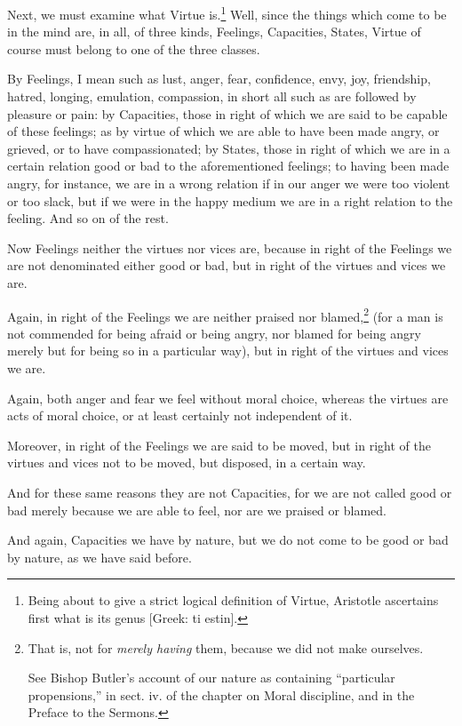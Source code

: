 
Next, we must examine what Virtue is.\footnote{Being about to give a strict logical definition of Virtue, Aristotle
ascertains first what is its genus [Greek: ti estin].}
Well, since the things which come to be in the mind are, in all, of three
kinds, Feelings, Capacities, States, Virtue of course must belong to one of the
three classes.

By Feelings, I mean such as lust, anger, fear, confidence, envy, joy,
friendship, hatred, longing, emulation, compassion, in short all such as are
followed by pleasure or pain: by Capacities, those in right of which we are
said to be capable of these feelings; as by virtue of which we are able to have
been made angry, or grieved, or to have compassionated; by States, those in
right of which we are in a certain relation good or bad to the aforementioned
feelings; to having been made angry, for instance, we are in a wrong relation
if in our anger we were too violent or too slack, but if we were in the happy
medium we are in a right relation to the feeling. And so on of the rest.

Now Feelings neither the virtues nor vices are, because in right of the
Feelings we are not denominated either good or bad, but in right of the virtues
and vices we are.

Again, in right of the Feelings we are neither praised nor
blamed,\footnote{That is, not for \emph{merely having} them, because we did not make
ourselves.

See Bishop Butler’s account of our nature as containing
“particular propensions,” in sect. iv. of the chapter on Moral
discipline, and in the Preface to the Sermons.}
(for a man is not commended for being afraid or being angry, nor blamed for
being angry merely but for being so in a particular way), but in right of the
virtues and vices we are.

Again, both anger and fear we feel without moral choice, whereas the virtues
are acts of moral choice, or at least certainly not independent of it.

Moreover, in right of the Feelings we are said to be moved, but in right of the
virtues and vices not to be moved, but disposed, in a certain way.

And for these same reasons they are not Capacities, for we are not called good
or bad merely because we are able to feel, nor are we praised or blamed.

And again, Capacities we have by nature, but we do not come to be good or bad
by nature, as we have said before.

